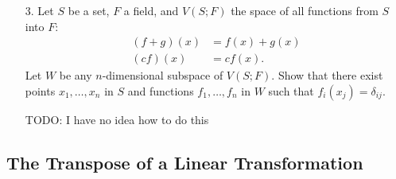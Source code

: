 \documentclass{article}
\begin{document}
\begin{enumerate}[listparindent=\parindent]
\item[3.] Let \(S\) be a set, \(F\) a field, and \(V(S; F)\) the space of all functions from \(S\) into \(F\):
    \begin{align*}
        (f + g)(x) &= f(x) + g(x) \\
           (cf)(x) &= cf(x).
    \end{align*}
    Let \(W\) be any \(n\)-dimensional subspace of \(V(S; F)\).
    Show that there exist points \(x_1, \dots, x_n\) in \(S\) and functions \(f_1, \dots, f_n\) in \(W\) such that \(f_i(x_j) = \delta_{ij}\).

    TODO: I have no idea how to do this

\end{enumerate}

\subsection{The Transpose of a Linear Transformation}
\end{document}
